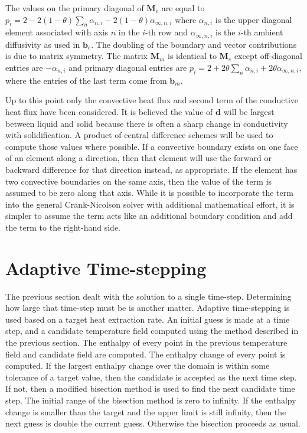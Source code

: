 \documentclass[]{article}
\newcommand{\cnm}{\bm{M}}
\newcommand{\cnb}{\bm{b}}
\newcommand{\cnd}{\bm{d}}
\begin{document}
The values on the primary diagonal of \(\cnm_{e}\) are equal to \(p_{i} = 2 - 2 \left( 1 - \theta \right) \sum_{n} \alpha_{n,i} - 2 \left( 1 - \theta \right) \alpha_{\infty,n,i}\) where \(\alpha_{n,i}\) is the upper diagonal element associated with axis \(n\) in the \(i\)-th row and \(\alpha_{\infty,n,i}\) is the \(i\)-th ambient diffusivity as used in \(\cnb_{e}\). The doubling of the boundary and vector contributions is due to matrix symmetry. The matrix \(\cnm_{m}\) is identical to \(\cnm_{e}\) except off-diagonal entries are \(-\alpha_{n,i}\) and primary diagonal entries are \(p_{i} = 2 + 2 \theta \sum_{n} \alpha_{n,i} + 2 \theta \alpha_{\infty,n,i}\), where the entries of the last term come from \(\cnb_{m}\).

Up to this point only the convective heat flux and second term of the conductive heat flux have been considered. It is believed the value of \(\cnd\) will be largest between liquid and solid because there is often a sharp change in conductivity with solidification. A product of central difference schemes will be used to compute those values where possible. If a convective boundary exists on one face of an element along a direction, then that element will use the forward or backward difference for that direction instead, as appropriate. If the element has two convective boundaries on the same axis, then the value of the term is assumed to be zero along that axis. While it is possible to incorporate the term into the general Crank-Nicolson solver with additional mathematical effort, it is simpler to assume the term acts like an additional boundary condition and add the term to the right-hand side.

\section{Adaptive Time-stepping}

The previous section dealt with the solution to a single time-step. Determining how large that time-step must be is another matter. Adaptive time-stepping is used based on a target heat extraction rate. An initial guess is made at a time step, and a candidate temperature field computed using the method described in the previous section. The enthalpy of every point in the previous temperature field and candidate field are computed. The enthalpy change of every point is computed. If the largest enthalpy change over the domain is within some tolerance of a target value, then the candidate is accepted as the next time step. If not, then a modified bisection method is used to find the next candidate time step. The initial range of the bisection method is zero to infinity. If the enthalpy change is smaller than the target and the upper limit is still infinity, then the next guess is double the current guess. Otherwise the bisection proceeds as usual.
\end{document}
